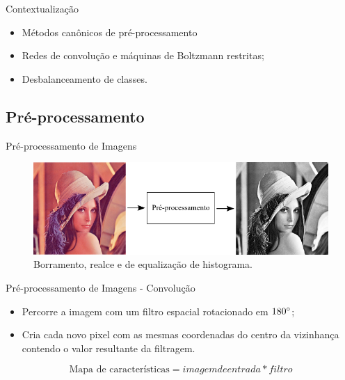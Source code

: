 \documentclass{beamer}
\begin{document}
\begin{frame}{Contextualização}
\begin{itemize}
    \item Métodos canônicos de pré-processamento
    \item Redes de convolução e máquinas de Boltzmann restritas;
    \item Desbalanceamento de classes.
\end{itemize}
\end{frame}
\subsection{Pré-processamento}
\begin{frame}{Pré-processamento de Imagens}
\begin{figure}[htbp]
 \begin{center}
   \includegraphics[width=1\linewidth]{figuras/preprocessamento.png}
 \caption{Borramento, realce e de equalização de histograma.}
 \end{center}
\end{figure}
\end{frame}
\begin{frame}{Pré-processamento de Imagens - Convolução}
\begin{itemize}
    \item Percorre a imagem com um filtro espacial rotacionado em $180\degree$; \\
    \item Cria cada novo pixel com as mesmas coordenadas do centro da vizinhança contendo o valor resultante da filtragem.
\end{itemize}
\begin{equation}
\text{Mapa de características} = imagem de entrada * filtro
\end{equation}
\end{frame}
\end{document}
